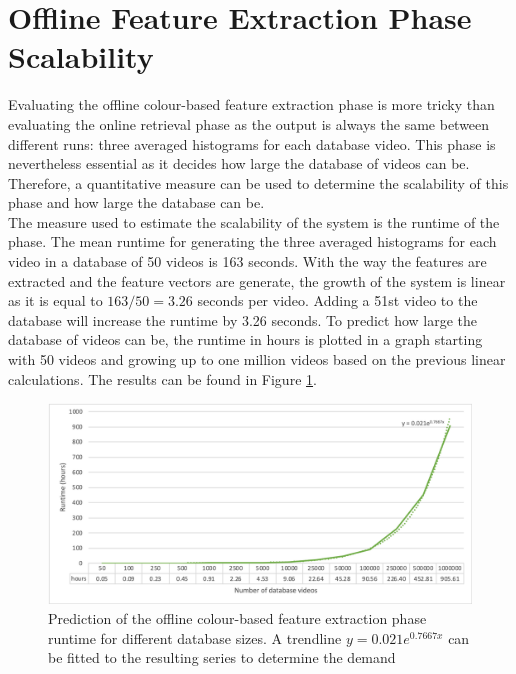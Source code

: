 \section{Offline Feature Extraction Phase Scalability}

Evaluating the offline colour-based feature extraction phase is more tricky than evaluating the online retrieval phase as the output is always the same between different runs: three averaged histograms for each database video. This phase is nevertheless essential as it decides how large the database of videos can be. Therefore, a quantitative measure can be used to determine the scalability of this phase and how large the database can be.\\

The measure used to estimate the scalability of the system is the runtime of the phase. The mean runtime for generating the three averaged histograms for each video in a database of 50 videos is 163 seconds. With the way the features are extracted and the feature vectors are generate, the growth of the system is linear as it is equal to $163/50=3.26$ seconds per video. Adding a 51st video to the database will increase the runtime by 3.26 seconds. To predict how large the database of videos can be, the runtime in hours is plotted in a graph starting with 50 videos and growing up to one million videos based on the previous linear calculations. The results can be found in Figure \ref{fig:evaluation-offline_phase_runtime_trendline}.

\begin{figure}[h]
\centerline{\includegraphics[width=\textwidth]{figures/evaluation/offline_phase_runtime_trendline.png}}
\caption{\label{fig:evaluation-offline_phase_runtime_trendline}Prediction of the offline colour-based feature extraction phase runtime for different database sizes. A trendline $y=0.021e^{0.7667x}$ can be fitted to the resulting series to determine the demand }
\end{figure}

